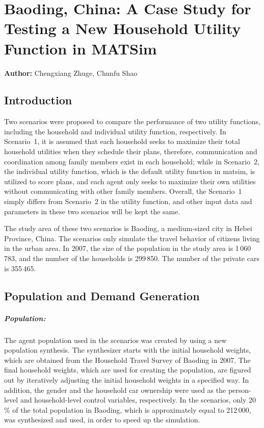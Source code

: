 \chapter{Baoding, China: A Case Study for Testing a New Household Utility Function in MATSim}
\label{ch:baoding}
\hfill \textbf{Author:} Chengxiang Zhuge, Chunfu Shao


\section{Introduction}
Two scenarios were proposed to compare the performance of two utility functions, including the household and individual utility function, respectively. 
In Scenario~1, it is assumed that each household seeks to maximize their total household utilities when they schedule their plans, therefore, communication and coordination among family members exist in each household; while in Scenario~2, the individual utility function, which is the default utility function in \gls{matsim}, is utilized to score plans, and each agent only seeks to maximize their own utilities without communicating with other family members. 
Overall, the Scenario~1 simply differs from Scenario~2 in the utility function, and other input data and parameters in these two scenarios will be kept the same. 

The study area of these two scenarios is Baoding, a medium-sized city in Hebei Province, China. 
The scenarios only simulate the travel behavior of citizens living in the urban area. 
In 2007, the size of the population in the study area is 1\,060\,783, and the number of the households is 299\,850.  
The number of the private cars is 355\,465. 

\section{Population and Demand Generation}
\paragraph{Population:} The agent population used in the scenarios was created by using a new population synthesis. 
The synthesizer starts with the initial household weights, which are obtained from the Household Travel Survey of Baoding in 2007. 
The final household weights, which are used for creating the population, are figured out by iteratively adjusting the initial household weights in a specified way. 
In addition, the gender and the household car ownership were used as the person-level and household-level control variables, respectively. 
In the scenarios, only 20\,\% of the total population in Baoding, which is approximately equal to 212\,000, was synthesized and used, in order to speed up the simulation. 

